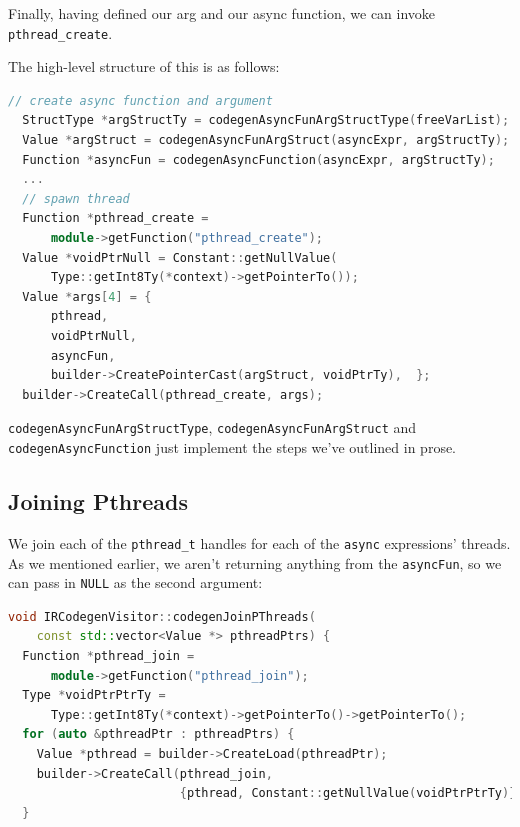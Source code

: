 Finally, having defined our arg and our async function, we can invoke
\texttt{pthread\_create}.

The high-level structure of this is as follows:

%

\begin{lstlisting}[caption={pthread\_codegen.cc},language=C++]
// create async function and argument
  StructType *argStructTy = codegenAsyncFunArgStructType(freeVarList);
  Value *argStruct = codegenAsyncFunArgStruct(asyncExpr, argStructTy);
  Function *asyncFun = codegenAsyncFunction(asyncExpr, argStructTy);
  ...
  // spawn thread
  Function *pthread_create =
      module->getFunction("pthread_create");
  Value *voidPtrNull = Constant::getNullValue(
      Type::getInt8Ty(*context)->getPointerTo());
  Value *args[4] = {
      pthread,
      voidPtrNull,
      asyncFun,
      builder->CreatePointerCast(argStruct, voidPtrTy),  };
  builder->CreateCall(pthread_create, args);
\end{lstlisting}

\texttt{codegenAsyncFunArgStructType}, \texttt{codegenAsyncFunArgStruct}
and \texttt{codegenAsyncFunction} just implement the steps we've
outlined in prose.

\hypertarget{joining-pthreads}{%
\subsection{\texorpdfstring{\protect\hyperlink{joining-pthreads}{}Joining
Pthreads}{Joining Pthreads}}\label{joining-pthreads}}

We join each of the \texttt{pthread\_t} handles for each of the
\texttt{async} expressions' threads.\\
As we mentioned earlier, we aren't returning anything from the
\texttt{asyncFun}, so we can pass in \texttt{NULL} as the second
argument:

%

\begin{lstlisting}[caption={pthread\_codegen.cc},language=C++]
void IRCodegenVisitor::codegenJoinPThreads(
    const std::vector<Value *> pthreadPtrs) {
  Function *pthread_join =
      module->getFunction("pthread_join");
  Type *voidPtrPtrTy =
      Type::getInt8Ty(*context)->getPointerTo()->getPointerTo();
  for (auto &pthreadPtr : pthreadPtrs) {
    Value *pthread = builder->CreateLoad(pthreadPtr);
    builder->CreateCall(pthread_join,
                        {pthread, Constant::getNullValue(voidPtrPtrTy)});  
  }
\end{lstlisting}

